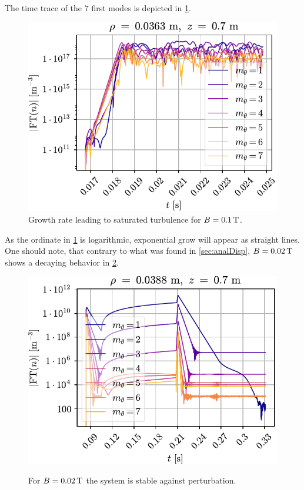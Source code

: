 The time trace of the $7$ first modes is depicted in \cref{fig:fourierUnstable}.
%
\begin{figure}[h!]
    \centering
    \includegraphics{fig/results/fourierModes/unstable}
    \caption{Growth rate leading to saturated turbulence for $B=0.1\, \text{T}$.}
    \label{fig:fourierUnstable}
\end{figure}
%
As the ordinate in \cref{fig:fourierUnstable} is logarithmic, exponential grow will appear as straight lines.
One should note, that contrary to what was found in \cref{sec:analDisp}, $B=0.02\, \text{T}$ shows a decaying behavior in \cref{fig:fourierStable}.
%
\begin{figure}[h!]
    \centering
    \includegraphics{fig/results/fourierModes/stable}
    \label{fig:fourierStable}
    \caption{For $B=0.02\, \text{T}$ the system is stable against perturbation.}
\end{figure}
